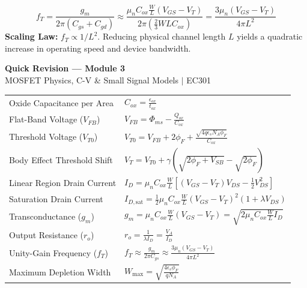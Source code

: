 \documentclass[12pt,a4paper]{article}
\renewcommand{\arraystretch}{1.45}
\begin{document}
\begin{tcolorbox}[formulabox, title={\textbf{Unity-Gain Cut-Off Frequency}}]
\begin{equation}
  f_T = \frac{g_m}{2\pi (C_{gs} + C_{gd})} \approx \frac{\mu_n C_{ox} \frac{W}{L} (V_{GS} - V_T)}{2\pi \left(\frac{2}{3} W L C_{ox}\right)} = \frac{3 \mu_n (V_{GS} - V_T)}{4\pi L^2}
\end{equation}
\textbf{Scaling Law:} $f_T \propto 1/L^2$. Reducing physical channel length $L$ yields a quadratic increase in operating speed and device bandwidth.
\end{tcolorbox}

\newpage
\begin{center}
  {\large\bfseries\color{myred} Quick Revision --- Module 3}\\[3pt]
  {\small\color{mydark} MOSFET Physics, C-V \& Small Signal Models $|$ EC301}
\end{center}
\noindent{\color{myred}\rule{\linewidth}{1.2pt}}
\vspace{4pt}

\begin{tcolorbox}[formulabox, title={\textbf{Key Formulas and Metrics at a Glance}}]
\renewcommand{\arraystretch}{1.35}
\begin{tabularx}{\linewidth}{B{5.0cm} X}
Oxide Capacitance per Area & $C_{ox} = \frac{\epsilon_{ox}}{t_{ox}}$ \\[4pt]
Flat-Band Voltage ($V_{FB}$) & $V_{FB} = \Phi_{ms} - \frac{Q_{ox}}{C_{ox}}$ \\[4pt]
Threshold Voltage ($V_{T0}$) & $V_{T0} = V_{FB} + 2\phi_F + \frac{\sqrt{4q\epsilon_s N_A \phi_F}}{C_{ox}}$ \\[4pt]
Body Effect Threshold Shift & $V_T = V_{T0} + \gamma \left(\sqrt{2\phi_F + V_{SB}} - \sqrt{2\phi_F}\right)$ \\[4pt]
Linear Region Drain Current & $I_D = \mu_n C_{ox} \frac{W}{L} \left[(V_{GS}-V_T)V_{DS} - \frac{1}{2}V_{DS}^2\right]$ \\[4pt]
Saturation Drain Current & $I_{D,\text{sat}} = \frac{1}{2}\mu_n C_{ox}\frac{W}{L}(V_{GS}-V_T)^2(1+\lambda V_{DS})$ \\[4pt]
Transconductance ($g_m$) & $g_m = \mu_n C_{ox}\frac{W}{L}(V_{GS}-V_T) = \sqrt{2\mu_n C_{ox}\frac{W}{L}I_D}$ \\[4pt]
Output Resistance ($r_o$) & $r_o = \frac{1}{\lambda I_D} = \frac{V_A}{I_D}$ \\[4pt]
Unity-Gain Frequency ($f_T$) & $f_T \approx \frac{g_m}{2\pi C_{gs}} \approx \frac{3\mu_n(V_{GS}-V_T)}{4\pi L^2}$ \\[4pt]
Maximum Depletion Width & $W_{\text{max}} = \sqrt{\frac{4\epsilon_s \phi_F}{q N_A}}$ \\[4pt]
\end{tabularx}
\end{tcolorbox}
\end{document}
